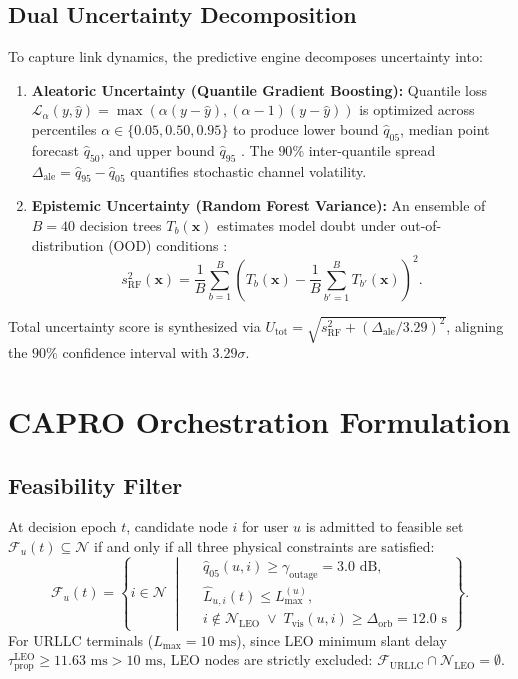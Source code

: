 \documentclass[conference]{IEEEtran}
\begin{document}
\subsection{Dual Uncertainty Decomposition}
To capture link dynamics, the predictive engine decomposes uncertainty into:
\begin{enumerate}
    \item \textbf{Aleatoric Uncertainty (Quantile Gradient Boosting):} Quantile loss $\mathcal{L}_\alpha(y, \hat{y}) = \max(\alpha(y - \hat{y}), (\alpha - 1)(y - \hat{y}))$ is optimized across percentiles $\alpha \in \{0.05, 0.50, 0.95\}$ to produce lower bound $\hat{q}_{05}$, median point forecast $\hat{q}_{50}$, and upper bound $\hat{q}_{95}$ \cite{koenker2001quantile, friedman2001greedy}. The $90\%$ inter-quantile spread $\Delta_{\text{ale}} = \hat{q}_{95} - \hat{q}_{05}$ quantifies stochastic channel volatility.
    \item \textbf{Epistemic Uncertainty (Random Forest Variance):} An ensemble of $B = 40$ decision trees $T_b(\mathbf{x})$ estimates model doubt under out-of-distribution (OOD) conditions \cite{breiman2001random}:
    \begin{equation}
    s_{\text{RF}}^2(\mathbf{x}) = \frac{1}{B} \sum_{b=1}^B \left( T_b(\mathbf{x}) - \frac{1}{B}\sum_{b'=1}^B T_{b'}(\mathbf{x}) \right)^2.
    \end{equation}
\end{enumerate}
Total uncertainty score is synthesized via $U_{\text{tot}} = \sqrt{s_{\text{RF}}^2 + (\Delta_{\text{ale}} / 3.29)^2}$, aligning the $90\%$ confidence interval with $3.29\sigma$.

\section{CAPRO Orchestration Formulation}
\label{sec:capro_formulation}

\subsection{Feasibility Filter}
At decision epoch $t$, candidate node $i$ for user $u$ is admitted to feasible set $\mathcal{F}_u(t) \subseteq \mathcal{N}$ if and only if all three physical constraints are satisfied:
\begin{equation}
\mathcal{F}_u(t) = \left\{ i \in \mathcal{N} \;\middle|\;
\begin{aligned}
&\hat{q}_{05}(u, i) \ge \gamma_{\text{outage}} = 3.0\text{ dB}, \\
&\hat{L}_{u,i}(t) \le L_{\text{max}}^{(u)}, \\
&i \notin \mathcal{N}_{\text{LEO}} \;\lor\; T_{\text{vis}}(u, i) \ge \Delta_{\text{orb}} = 12.0\text{ s}
\end{aligned}
\right\}.
\end{equation}
For URLLC terminals ($L_{\text{max}} = 10\text{ ms}$), since LEO minimum slant delay $\tau_{\text{prop}}^{\text{LEO}} \ge 11.63\text{ ms} > 10\text{ ms}$, LEO nodes are strictly excluded: $\mathcal{F}_{\text{URLLC}} \cap \mathcal{N}_{\text{LEO}} = \emptyset$.
\end{document}
